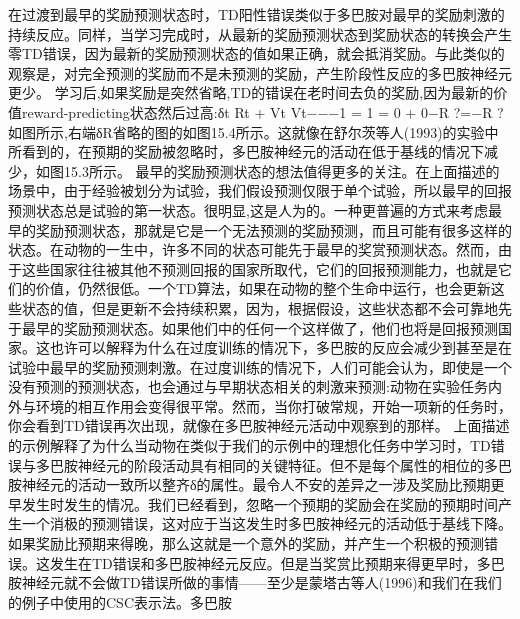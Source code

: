 在过渡到最早的奖励预测状态时，TD阳性错误类似于多巴胺对最早的奖励刺激的持续反应。同样，当学习完成时，从最新的奖励预测状态到奖励状态的转换会产生零TD错误，因为最新的奖励预测状态的值如果正确，就会抵消奖励。与此类似的观察是，对完全预测的奖励而不是未预测的奖励，产生阶段性反应的多巴胺神经元更少。
学习后,如果奖励是突然省略,TD的错误在老时间去负的奖励,因为最新的价值reward-predicting状态然后过高:δt Rt + Vt Vt−−−1 = 1 = 0 + 0−R ?=−R ?如图所示,右端δR省略的图的如图15.4所示。这就像在舒尔茨等人(1993)的实验中所看到的，在预期的奖励被忽略时，多巴胺神经元的活动在低于基线的情况下减少，如图15.3所示。
最早的奖励预测状态的想法值得更多的关注。在上面描述的场景中，由于经验被划分为试验，我们假设预测仅限于单个试验，所以最早的回报预测状态总是试验的第一状态。很明显,这是人为的。一种更普遍的方式来考虑最早的奖励预测状态，那就是它是一个无法预测的奖励预测，而且可能有很多这样的状态。在动物的一生中，许多不同的状态可能先于最早的奖赏预测状态。然而，由于这些国家往往被其他不预测回报的国家所取代，它们的回报预测能力，也就是它们的价值，仍然很低。一个TD算法，如果在动物的整个生命中运行，也会更新这些状态的值，但是更新不会持续积累，因为，根据假设，这些状态都不会可靠地先于最早的奖励预测状态。如果他们中的任何一个这样做了，他们也将是回报预测国家。这也许可以解释为什么在过度训练的情况下，多巴胺的反应会减少到甚至是在试验中最早的奖励预测刺激。在过度训练的情况下，人们可能会认为，即使是一个没有预测的预测状态，也会通过与早期状态相关的刺激来预测:动物在实验任务内外与环境的相互作用会变得很平常。然而，当你打破常规，开始一项新的任务时，你会看到TD错误再次出现，就像在多巴胺神经元活动中观察到的那样。
上面描述的示例解释了为什么当动物在类似于我们的示例中的理想化任务中学习时，TD错误与多巴胺神经元的阶段活动具有相同的关键特征。但不是每个属性的相位的多巴胺神经元的活动一致所以整齐δ的属性。最令人不安的差异之一涉及奖励比预期更早发生时发生的情况。我们已经看到，忽略一个预期的奖励会在奖励的预期时间产生一个消极的预测错误，这对应于当这发生时多巴胺神经元的活动低于基线下降。如果奖励比预期来得晚，那么这就是一个意外的奖励，并产生一个积极的预测错误。这发生在TD错误和多巴胺神经元反应。但是当奖赏比预期来得更早时，多巴胺神经元就不会做TD错误所做的事情——至少是蒙塔古等人(1996)和我们在我们的例子中使用的CSC表示法。多巴胺


